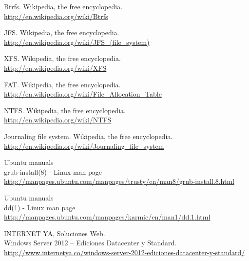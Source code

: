 \documentclass[paper=a4, fontsize=11pt]{scrartcl} %
\numberwithin{equation}{section} %
\numberwithin{figure}{section} %
\numberwithin{table}{section} %
\begin{document}
\begin{thebibliography}{10}
Btrfs. Wikipedia, the free encyclopedia.\\
  \url{http://en.wikipedia.org/wiki/Btrfs}

JFS. Wikipedia, the free encyclopedia.\\
  \url{http://en.wikipedia.org/wiki/JFS_(file_system)}

XFS. Wikipedia, the free encyclopedia.\\
  \url{http://en.wikipedia.org/wiki/XFS}

FAT. Wikipedia, the free encyclopedia.\\
  \url{http://en.wikipedia.org/wiki/File_Allocation_Table}

NTFS. Wikipedia, the free encyclopedia.\\
  \url{http://en.wikipedia.org/wiki/NTFS}

Journaling file system. Wikipedia, the free encyclopedia.\\
  \url{http://en.wikipedia.org/wiki/Journaling_file_system}

Ubuntu manuals\\
grub-install(8) - Linux man page\\
  \url{http://manpages.ubuntu.com/manpages/trusty/en/man8/grub-install.8.html}

Ubuntu manuals\\
dd(1) - Linux man page\\
\url{http://manpages.ubuntu.com/manpages/karmic/en/man1/dd.1.html}

INTERNET YA, Soluciones Web.\\
Windows Server 2012 – Ediciones Datacenter y Standard.\\
  \url{http://www.internetya.co/windows-server-2012-ediciones-datacenter-y-standard/}
\end{thebibliography}
\end{document}
